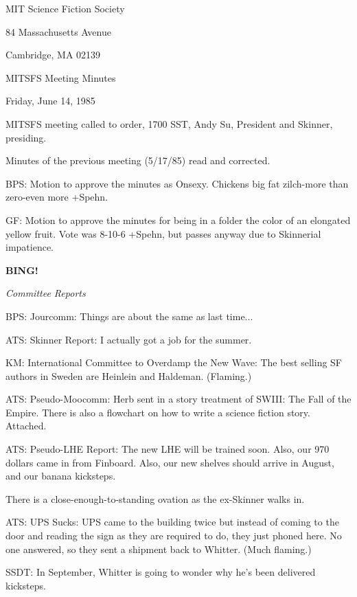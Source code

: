 \documentclass[12pt]{article}
\newcommand{\bing}{{\bf BING!} }
\newcommand{\goto}[1]{\bing \vskip 12pt \centerline{{\em{#1}}}}
\begin{document}
\begin{center}

MIT Science Fiction Society 

84 Massachusetts Avenue

Cambridge, MA 02139

\vspace{12pt}

MITSFS Meeting Minutes 

Friday, June 14, 1985

\end{center}
 
\vspace{18pt}

\setlength{\parskip}{6pt}

\noindent
MITSFS meeting called to order, 1700 SST,
Andy Su, President and Skinner, presiding.

Minutes of the previous meeting (5/17/85) read and corrected.

BPS: Motion to approve the minutes as Onsexy. Chickens big fat zilch-more than zero-even more +Spehn.

GF: Motion to approve the minutes for being in a folder the color of an elongated yellow fruit. Vote was 8-10-6 +Spehn, but passes anyway due to Skinnerial impatience.

\goto{Committee Reports}

BPS: Jourcomm: Things are about the same as last time...

ATS: Skinner Report: I actually got a job for the summer.

KM: International Committee to Overdamp the New Wave: The best selling SF authors in Sweden are Heinlein and Haldeman. (Flaming.)

ATS: Pseudo-Moocomm: Herb sent in a story treatment of SWIII: The Fall of the Empire. There is also a flowchart on how to write a science fiction story. Attached.

ATS: Pseudo-LHE Report: The new LHE will be trained soon. Also, our 970 dollars came in from Finboard. Also, our new shelves should arrive in August, and our banana kicksteps.

There is a close-enough-to-standing ovation as the ex-Skinner walks in.

ATS: UPS Sucks: UPS came to the building twice but instead of coming to the door and reading the sign as they are required to do, they just phoned here. No one answered, so they sent a shipment back to Whitter. (Much flaming.)

SSDT: In September, Whitter is going to wonder why he's been delivered kicksteps.
\end{document}
